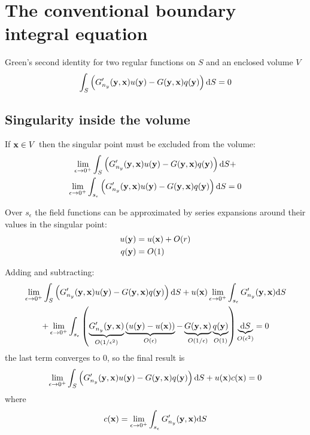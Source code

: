 \documentclass[a4paper,11pt]{article}
\newcommand{\td}{\mathrm{d}}
\begin{document}
\section{The conventional boundary integral equation}

Green's second identity for two regular functions on $S$ and an enclosed volume $V$
%
\begin{equation}
\int_{S}
\left(
G'_{n_y}({\bf y}, {\bf x}) u({\bf y}) - G({\bf y}, {\bf x}) q({\bf y})
\right)
\td S = 0
\end{equation}

\subsection{Singularity inside the volume}

If ${\bf x} \in V$ then the singular point must be excluded from the volume:
%
\begin{multline}
\lim_{\epsilon \to 0^+}
\int_{S}
\left(
G'_{n_y}({\bf y}, {\bf x}) u({\bf y}) - G({\bf y}, {\bf x}) q({\bf y})
\right)
\td S
+
\\
\lim_{\epsilon \to 0^+}
\int_{s_{\epsilon}}
\left(
G'_{n_y}({\bf y}, {\bf x}) u({\bf y}) - G({\bf y}, {\bf x}) q({\bf y})
\right)
\td S = 0
\end{multline}

Over $s_{\epsilon}$ the field functions can be approximated by series expansions around their values in the singular point:
%
\begin{align}
u({\bf y}) &= u({\bf x}) + O(r) \nonumber \\
q({\bf y}) &= O(1)
\end{align}

Adding and subtracting:
\begin{multline}
\lim_{\epsilon \to 0^+}
\int_{S}
\left(
G'_{n_y}({\bf y}, {\bf x}) u({\bf y}) - G({\bf y}, {\bf x}) q({\bf y})
\right)
\td S
+
u({\bf x})
\lim_{\epsilon \to 0^+}
\int_{s_{\epsilon}}
G'_{n_y}({\bf y}, {\bf x}) 
\td S
\\
+
\lim_{\epsilon \to 0^+}
\int_{s_{\epsilon}}
\left(
\underbrace{G'_{n_y}({\bf y}, {\bf x})}_{O(1/\epsilon^2)} \underbrace{\left(u({\bf y}) - u({\bf x})\right)}_{O(\epsilon)}
- \underbrace{G({\bf y}, {\bf x})}_{O(1/\epsilon)} \underbrace{q({\bf y})}_{O(1)}
\right)
\underbrace{\td S}_{O(\epsilon^2)}
= 0
\end{multline}
%
the last term converges to 0, so the final result is
%
\begin{equation}
\lim_{\epsilon \to 0^+}
\int_{S}
\left(
G'_{n_y}({\bf y}, {\bf x}) u({\bf y}) - G({\bf y}, {\bf x}) q({\bf y})
\right)
\td S
+
u({\bf x})
c({\bf x})
= 0
\end{equation}
%
where
%
\begin{equation}
c({\bf x})
=
\lim_{\epsilon \to 0^+}
\int_{s_{\epsilon}}
G'_{n_y}({\bf y}, {\bf x}) 
\td S
\end{equation}
\end{document}
